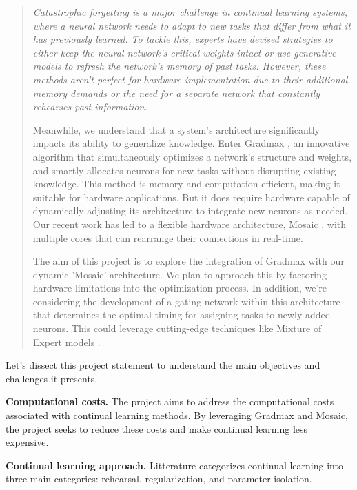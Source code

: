 \documentclass{article}
\begin{document}
\begin{quote}
    \itshape
    Catastrophic forgetting is a major challenge in continual learning systems, where a neural network needs to adapt to new tasks that differ from what it has previously learned. To tackle this, experts have devised strategies to either keep the neural network's critical weights intact or use generative models to refresh the network's memory of past tasks. However, these methods aren't perfect for hardware implementation due to their additional memory demands or the need for a separate network that constantly rehearses past information.

    Meanwhile, we understand that a system's architecture significantly impacts its ability to generalize knowledge. Enter Gradmax \cite{gradmax}, an innovative algorithm that simultaneously optimizes a network's structure and weights, and smartly allocates neurons for new tasks without disrupting existing knowledge. This method is memory and computation efficient, making it suitable for hardware applications. But it does require hardware capable of dynamically adjusting its architecture to integrate new neurons as needed. Our recent work has led to a flexible hardware architecture, Mosaic \cite{mosaic}, with multiple cores that can rearrange their connections in real-time.

    The aim of this project is to explore the integration of Gradmax with our dynamic 'Mosaic' architecture. We plan to approach this by factoring hardware limitations into the optimization process. In addition, we're considering the development of a gating network within this architecture that determines the optimal timing for assigning tasks to newly added neurons. This could leverage cutting-edge techniques like Mixture of Expert models \cite{DME}.
\end{quote}

Let's dissect this project statement to understand the main objectives and challenges it presents.

\textbf{Computational costs.} The project aims to address the computational costs associated with continual learning methods. By leveraging Gradmax and Mosaic, the project seeks to reduce these costs and make continual learning less expensive.

\textbf{Continual learning approach.} Litterature categorizes continual learning into three main categories: rehearsal, regularization, and parameter isolation. 
\end{document}
